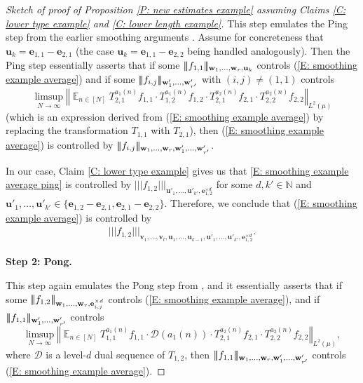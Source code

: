 \documentclass[11pt]{amsart}
\theoremstyle{definition}
\DeclareMathOperator*{\E}{\mathbb{E}}
\newcommand{\N}{{\mathbb N}}
\newcommand{\CD}{{\mathcal D}}
\newcommand{\be}{{\mathbf{e}}}
\newcommand{\bu}{{\mathbf{u}}}
\newcommand{\bv}{{\mathbf{v}}}
\newcommand{\norm}[1]{\left\Vert #1\right\Vert}
\newcommand{\nnorm}[1]{\lvert\!|\!| #1|\!|\!\rvert}
\newcommand{\1}{{\mathbf{1}}}
\begin{document}
\begin{proof}[Sketch of proof of Proposition \ref{P: new estimates example} assuming Claims \ref{C: lower type example} and \ref{C: lower length example}]
   This step emulates the Ping step from the earlier smoothing arguments \cite{DKKST24, FrKu22b, FrKu22a}. Assume for concreteness that $\bu_k=\be_{1,1}-\be_{2,1}$ (the case $\bu_k=\be_{1,1}-\be_{2,2}$ being handled analogously). Then the Ping step essentially asserts that if some $\nnorm{f_{1,1}}_{\bold{w}_{1},\dots,\bold{w}_{r},\bu_k}$ controls (\ref{E: smoothing example average}) and if some $\nnorm{f_{i,j}}_{\bold{w}'_{1},\dots,\bold{w}'_{r'}}$ with $(i,j)\neq (1,1)$ controls
   \begin{equation}\label{E: smoothing example average ping}
    \limsup_{N\to\infty}\norm{\E_{n\in [N]} T_{2,1}^{a_{1}(n)} f_{1,1}\cdot T_{1,2}^{a_{1}(n)} f_{1,2}\cdot T_{2,1}^{a_{2}(n)} f_{2,1}\cdot T_{2,2}^{a_{2}(n)} f_{2,2}}_{L^2(\mu)}
\end{equation}
(which is an expression derived from (\ref{E: smoothing example average}) by replacing the transformation $T_{1,1}$ with $T_{2,1}$), then (\ref{E: smoothing example average}) is controlled by $\nnorm{f_{i,j}}_{\bold{w}_{1},\dots,\bold{w}_{r}, \bold{w}'_{1},\dots,\bold{w}'_{r'}}$.

In our case, Claim \ref{C: lower type example} gives us that \eqref{E: smoothing example average ping} is controlled by $\nnorm{f_{1,2}}_{\bu'_{1},\dots,\bu'_{k'},\be_{1,2}^{\times d}}$ for some $d, k'\in\N$ and $\bu'_{1},\dots,\bu'_{k'}\in \{\be_{1,2}-\be_{2,1},\be_{2,1}-\be_{2,2}\}$. %
Therefore, we conclude that (\ref{E: smoothing example average}) is controlled by 
\begin{align}\label{E: auxiliary ping control}
    \nnorm{f_{1,2}}_{\bv_{1},\dots,\bv_{t},\bu_{1},\dots,\bu_{k-1},\bu'_{1},\dots,\bu'_{k'}, \be_{1,2}^{\times d}}.
\end{align}

 \smallskip
   \textbf{Step 2: Pong.} 
   \smallskip 
   
This step again emulates the Pong step from \cite{DKKST24, FrKu22b, FrKu22a}, and it essentially asserts that if some $\nnorm{f_{1,2}}_{\bold{w}_{1},\dots,\bold{w}_{r},\be_{i,j}^{\times d}}$ controls (\ref{E: smoothing example average}), and if $\nnorm{f_{1,1}}_{\bold{w}'_{1},\dots,\bold{w}'_{r'}}$ controls
   \begin{equation}\label{E: smoothing example average pong}
    \limsup_{N\to\infty}\norm{\E_{n\in [N]} T_{1,1}^{a_{1}(n)}f_{1,1}\cdot \CD(a_1(n)) \cdot T_{2,1}^{a_{2}(n)} f_{2,1}\cdot T_{2,2}^{a_{2}(n)} f_{2,2}}_{L^2(\mu)},
\end{equation}
where $\CD$ is a level-$d$ dual sequence of $T_{1,2}$,
then $\nnorm{f_{1,1}}_{\bold{w}_{1},\dots,\bold{w}_{r},\bold{w}'_{1},\dots,\bold{w}'_{r'}}$ controls (\ref{E: smoothing example average}). 


\end{proof}
\end{document}
